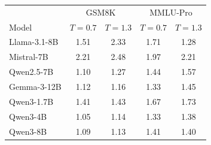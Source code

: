 \begin{tabular}{lcccc}
\toprule
 & \multicolumn{2}{c}{GSM8K} & \multicolumn{2}{c}{MMLU-Pro} \\
Model & $T{=}0.7$ & $T{=}1.3$ & $T{=}0.7$ & $T{=}1.3$ \\
\midrule
Llama-3.1-8B & 1.51 & 2.33 & 1.71 & 1.28 \\
Mistral-7B & 2.21 & 2.48 & 1.97 & 2.21 \\
Qwen2.5-7B & 1.10 & 1.27 & 1.44 & 1.57 \\
Gemma-3-12B & 1.12 & 1.16 & 1.33 & 1.45 \\
Qwen3-1.7B & 1.41 & 1.43 & 1.67 & 1.73 \\
Qwen3-4B & 1.05 & 1.14 & 1.33 & 1.38 \\
Qwen3-8B & 1.09 & 1.13 & 1.41 & 1.40 \\
\bottomrule
\end{tabular}
